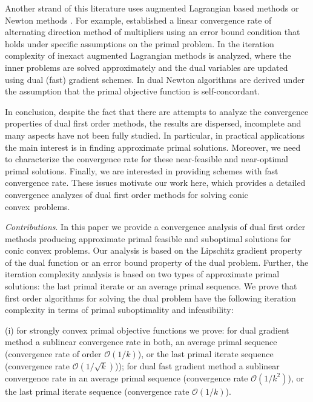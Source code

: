 \documentclass{gOMS2e}
\theoremstyle{plain}
\theoremstyle{definition}
\theoremstyle{remark}
\begin{document}
\noindent Another strand of this literature uses augmented
Lagrangian based methods  \cite{HonLuo:12,LanMon:08,NedNec:12} or
Newton methods \cite{WeiOzd:10,NecSuy:09}. For example,
\cite{HonLuo:12} established a  linear convergence rate of
alternating direction method of multipliers using an error bound
condition that holds under specific assumptions on the primal
problem. In \cite{LanMon:08,NedNec:12} the iteration complexity of
inexact augmented Lagrangian methods is analyzed, where the inner
problems are solved approximately and the dual variables are updated
using dual (fast) gradient schemes.  In \cite{WeiOzd:10,NecSuy:09}
dual Newton algorithms are derived  under the assumption that the
primal objective function is self-concordant.

\noindent In conclusion, despite the fact that there are attempts to
analyze the convergence properties of dual  first order methods, the
results are dispersed, incomplete and many aspects have not been
fully studied. In particular, in practical applications the main
interest is in finding  approximate primal solutions. Moreover, we
need to characterize the convergence rate for these near-feasible
and near-optimal primal solutions. Finally, we are interested in
providing  schemes with fast convergence rate. These issues motivate
our work here, which provides 
a detailed convergence analyzes of dual first order methods for
solving conic convex~problems.

\vspace{0.04cm}

\noindent \textit{Contributions}. In this paper we  provide a
convergence analysis of  dual first order methods producing
approximate primal feasible and suboptimal solutions for conic
convex  problems. Our analysis is based on the Lipschitz gradient
property of the dual function or an error bound property of the dual
problem. Further, the iteration complexity analysis is based on two
types of approximate primal solutions:  the last primal iterate or
an average primal sequence. We prove that first order algorithms for
solving the dual problem have the following iteration complexity in
terms of primal suboptimality and infeasibility:

\noindent (i) for strongly convex primal objective functions we
prove: for dual gradient method a  sublinear convergence rate in
both, an average primal sequence (convergence rate of order
$\mathcal{O}(1/k)$), or the last primal iterate sequence
(convergence rate $\mathcal{O}(1/\sqrt{k})$)); for dual fast
gradient method a sublinear convergence rate in an average primal
sequence (convergence rate $\mathcal{O}(1/k^2)$), or the last primal
iterate sequence (convergence rate $\mathcal{O}(1/k)$).
\end{document}
